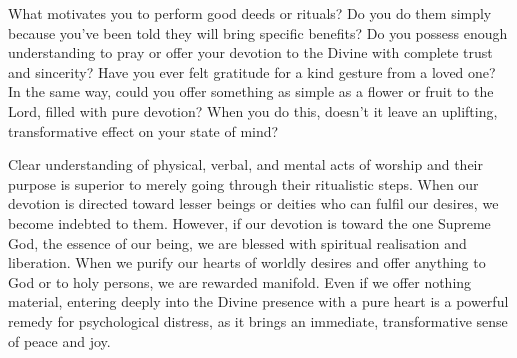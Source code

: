\newpage
\begin{mananam}{}
\normalfont\mananamtext What motivates you to perform good deeds or rituals? Do you do them simply because you’ve been told they will bring specific benefits? Do you possess enough understanding to pray or offer your devotion to the Divine with complete trust and sincerity? 
Have you ever felt gratitude for a kind gesture from a loved one? In the same way, could you offer something as simple as a flower or fruit to the Lord, filled with pure devotion? When you do this, doesn’t it leave an uplifting, transformative effect on your state of mind?
\end{mananam}
\sreflect
\begin{inspiration}{}
\normalfont\mananamtext Clear understanding of physical, verbal, and mental acts of worship and their purpose is superior to merely going through their ritualistic steps. When our devotion is directed toward lesser beings or deities who can fulfil our desires, we become indebted to them. However, if our devotion is toward the one Supreme God, the essence of our being, we are blessed with spiritual realisation and liberation.
When we purify our hearts of worldly desires and offer anything to God or to holy persons, we are rewarded manifold. Even if we offer nothing material, entering deeply into the Divine presence with a pure heart is a powerful remedy for psychological distress, as it brings an immediate, transformative sense of peace and joy.
\end{inspiration}
\newpage

